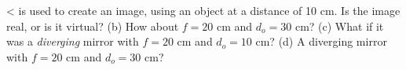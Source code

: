 <%
is used to create an image, using an object at a distance of
10 cm. Is the image real, or is it virtual? (b) How about
$f=20$ cm and $d_o=30$ cm? (c) What if it was a \emph{diverging}
mirror with $f=20$ cm and $d_o=10$ cm? (d) A diverging
mirror with $f=20$ cm and $d_o=30$ cm?
